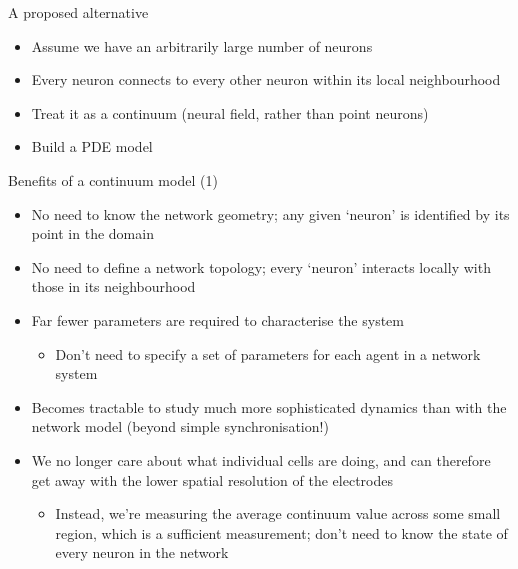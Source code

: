\documentclass[presentation]{beamer}
\begin{document}
\begin{frame}[label={sec:org35bbe58}]{A proposed alternative}
\begin{itemize}
\item Assume we have an arbitrarily large number of neurons
\item Every neuron connects to every other neuron within its local neighbourhood
\item Treat it as a continuum (neural field, rather than point neurons)
\item Build a PDE model
\end{itemize}
\end{frame}

\begin{frame}[label={sec:org8b755d1}]{Benefits of a continuum model (1)}
\begin{itemize}
\item No need to know the network geometry; any given `neuron' is identified by its point in the domain
\item No need to define a network topology; every `neuron' interacts locally with those in its neighbourhood
\item Far fewer parameters are required to characterise the system
\begin{itemize}
\item Don't need to specify a set of parameters for each agent in a network system
\end{itemize}
\item Becomes tractable to study much more sophisticated dynamics than with the network model (beyond simple synchronisation!)
\item We no longer care about what individual cells are doing, and can therefore get away with the lower spatial resolution of the electrodes
\begin{itemize}
\item Instead, we're measuring the average continuum value across some small region, which is a sufficient measurement; don't need to know the state of every neuron in the network
\end{itemize}
\end{itemize}
\end{frame}
\end{document}
